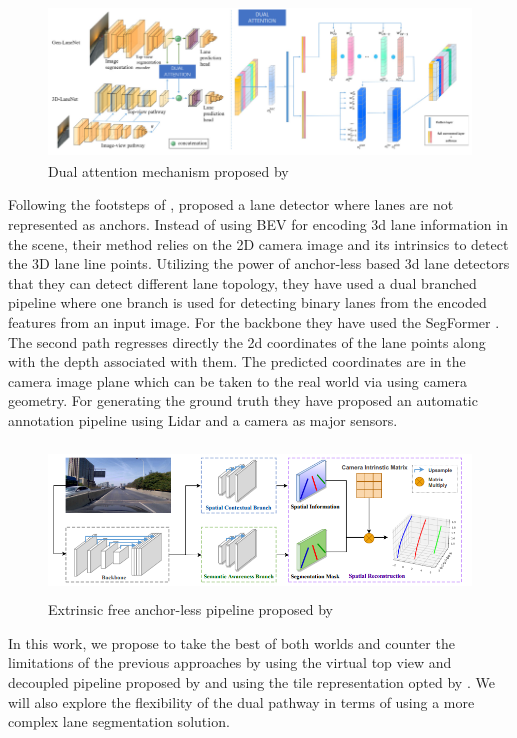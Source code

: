  \begin{figure}[h]
    \centering
\includegraphics[width=12cm, height=4cm]{images/dual_attention_pipeline.png}
    \caption{Dual attention mechanism  proposed by  \cite{9506296}}
    \end{figure}

Following the footsteps of \cite{DBLP:journals/corr/abs-2011-01535}, \cite{yan2022once} proposed a lane detector where lanes are not represented as anchors. Instead of using BEV for encoding 3d lane information in the scene, their method relies on the 2D camera image and its intrinsics to detect the 3D lane line points. Utilizing the power of anchor-less based 3d lane detectors that they can detect different lane topology, they have used a dual branched pipeline where one branch is used for detecting binary lanes from the encoded features from an input image. For the backbone they have used the SegFormer \cite{DBLP:journals/corr/abs-2105-15203}. The second path regresses directly the 2d coordinates of the lane points along with the depth associated with them. The predicted coordinates are in the camera image plane which can be taken to the real world via using camera geometry. For generating the ground truth they have proposed an automatic annotation pipeline using Lidar and a camera as major sensors.

\begin{figure}[h]
    \centering
\includegraphics[width=12cm, height=4cm]{images/once_pipeline.png}
    \caption{Extrinsic free anchor-less pipeline proposed by \cite{yan2022once}}
    \end{figure}

In this work, we propose to take the best of both worlds and counter the limitations of the previous approaches by using the virtual top view and decoupled pipeline proposed by \cite{guo2020gen} and using the tile representation opted by \cite{DBLP:journals/corr/abs-2011-01535}. We will also explore the flexibility of the dual pathway in terms of using a more complex lane segmentation solution.

